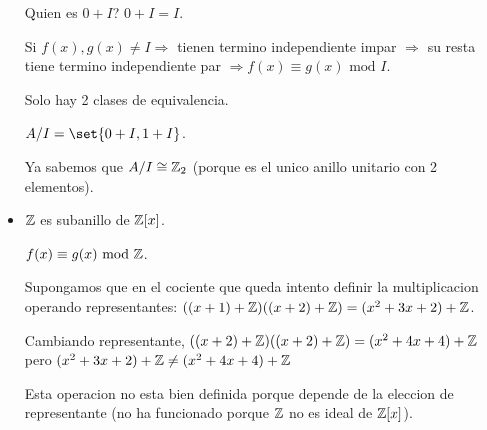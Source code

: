 \begin{example}
\begin{itemize}
		      Quien es \(0 + I \)? \(0 + I = I  \).
		      
		      Si \(f(x), g(x) \neq I \Rightarrow\) tienen termino independiente impar \(\Rightarrow \) su resta tiene termino independiente par \(\Rightarrow f(x) \equiv g(x) \text{ mod } I \).
		      
		      Solo hay 2 clases de equivalencia.
		      
		      \(A/I = \set{0 + I, 1 + I }\).
		      
		      Ya sabemos que \(A/I \cong \mathbb{Z}_2 \) (porque es el unico anillo unitario con 2 elementos).
		\item \(\mathbb{Z}\) es subanillo de \(\mathbb{Z}[x ]\).
		      
		      \(f(x) \equiv g(x) \text{ mod } \mathbb{Z} \).
		      
		      Supongamos que en el cociente que queda intento definir la multiplicacion operando representantes: \(((x + 1) + \mathbb{Z})((x + 2) + \mathbb{Z}) = (x^{2} + 3x + 2 ) + \mathbb{Z} \).
		      
		      Cambiando representante, \(((x + 2) + \mathbb{Z})((x + 2) + \mathbb{Z}) = (x^{2} + 4x + 4 ) + \mathbb{Z}\) pero \((x^{2} + 3x + 2 ) + \mathbb{Z} \neq (x^{2} + 4x + 4 ) + \mathbb{Z}\)
		      
		      Esta operacion no esta bien definida porque depende de la eleccion de representante (no ha funcionado porque \(\mathbb{Z} \) no es ideal de \(\mathbb{Z}[x ]\)).
	\end{itemize}
\end{example}


